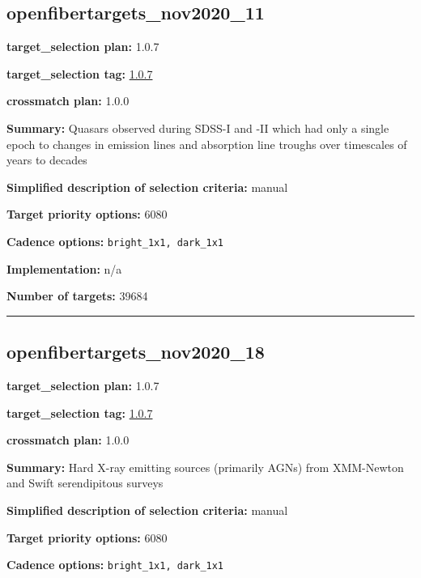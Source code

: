 \hypertarget{openfibertargets_nov2020_11_plan1.0.7}{%
\subsection{openfibertargets\_nov2020\_11}\label{openfibertargets_nov2020_11_plan1.0.7}}

\noindent\textbf{target\_selection plan:} 1.0.7

\noindent\textbf{target\_selection tag:}
\href{https://github.com/sdss/target_selection/tree/1.0.7/}{1.0.7}

\noindent\textbf{crossmatch plan:} 1.0.0

\noindent\textbf{Summary:} Quasars observed during SDSS-I and -II which had only
a single epoch to changes in emission lines and absorption line troughs
over timescales of years to decades

\noindent\textbf{Simplified description of selection criteria:} manual


\noindent\textbf{Target priority options:} 6080

\noindent\textbf{Cadence options:} \texttt{bright\_1x1,\ dark\_1x1}

\noindent\textbf{Implementation:} n/a

\noindent\textbf{Number of targets:} 39684

\begin{center}\rule{0.5\linewidth}{0.5pt}\end{center}

\hypertarget{openfibertargets_nov2020_18_plan1.0.7}{%
\subsection{openfibertargets\_nov2020\_18}\label{openfibertargets_nov2020_18_plan1.0.7}}

\noindent\textbf{target\_selection plan:} 1.0.7

\noindent\textbf{target\_selection tag:}
\href{https://github.com/sdss/target_selection/tree/1.0.7/}{1.0.7}

\noindent\textbf{crossmatch plan:} 1.0.0

\noindent\textbf{Summary:} Hard X-ray emitting sources (primarily AGNs) from
XMM-Newton and Swift serendipitous surveys

\noindent\textbf{Simplified description of selection criteria:} manual


\noindent\textbf{Target priority options:} 6080

\noindent\textbf{Cadence options:} \texttt{bright\_1x1,\ dark\_1x1}

